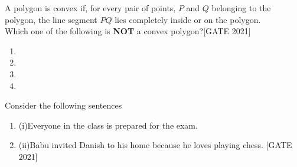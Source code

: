     \item A polygon is convex if, for every pair of points, $ P $ and $ Q $ belonging to the polygon, the line segment $ PQ $ lies completely inside or on the polygon.\\
    Which one of the following is \textbf{NOT} a convex polygon?\hfill{[GATE 2021]}
 \begin{multicols}{2}
    \begin{enumerate}
 \item {}        
        \item {}
       \item {}
        \item  {}
        
        
    \end{enumerate}
    \end{multicols}
    \item Consider the following sentences \\
\begin{enumerate}[label={}]
\item (i)Everyone in  the class is prepared for the exam.
\item (ii)Babu invited Danish to his home because he loves playing chess.
\hfill{[GATE 2021]}\\
\end{enumerate}

